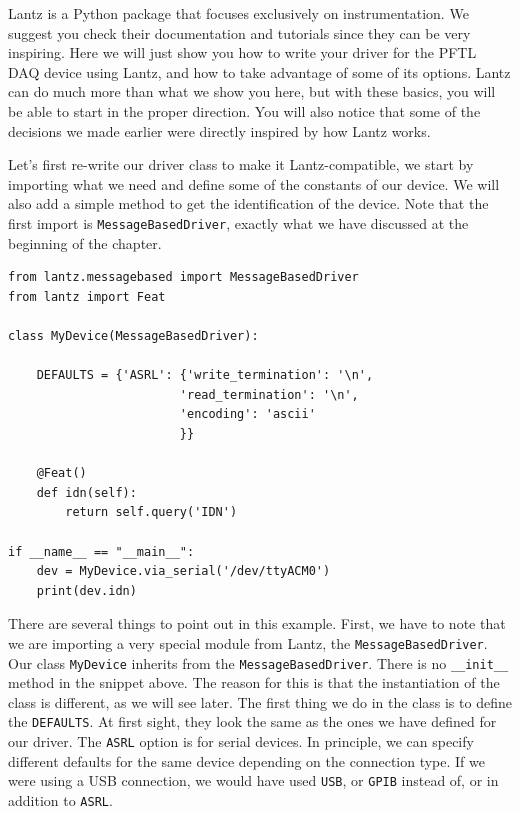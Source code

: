 Lantz is a Python package that focuses exclusively on instrumentation. We suggest you check their documentation and tutorials since they can be very inspiring. Here we will just show you how to write your driver for the {PFTL DAQ} device using Lantz, and how to take advantage of some of its options. Lantz can do much more than what we show you here, but with these basics, you will be able to start in the proper direction. You will also notice that some of the decisions we made earlier were directly inspired by how Lantz works. 

Let's first re-write our driver class to make it Lantz-compatible, we start by importing what we need and define some of the constants of our device. We will also add a simple method to get the identification of the device. Note that the first import is \texttt{MessageBasedDriver}, exactly what we have discussed at the beginning of the chapter.

\begin{verbatim}
from lantz.messagebased import MessageBasedDriver
from lantz import Feat

class MyDevice(MessageBasedDriver):

    DEFAULTS = {'ASRL': {'write_termination': '\n',
                        'read_termination': '\n',
                        'encoding': 'ascii'
                        }}

    @Feat()
    def idn(self):
        return self.query('IDN')

if __name__ == "__main__":
    dev = MyDevice.via_serial('/dev/ttyACM0')
    print(dev.idn)
\end{verbatim}

There are several things to point out in this example. First, we have to note that we are importing a very special module from Lantz, the \texttt{MessageBasedDriver}. Our class \texttt{MyDevice} inherits from the \texttt{MessageBasedDriver}. There is no \texttt{__init__} method in the snippet above. The reason for this is that the instantiation of the class is different, as we will see later. The first thing we do in the class is to define the \texttt{DEFAULTS}. At first sight, they look the same as the ones we have defined for our driver. The \texttt{ASRL} option is for serial devices. In principle, we can specify different defaults for the same device depending on the connection type. If we were using a {USB} connection, we would have used \texttt{USB}, or \texttt{GPIB} instead of, or in
addition to \texttt{ASRL}.

